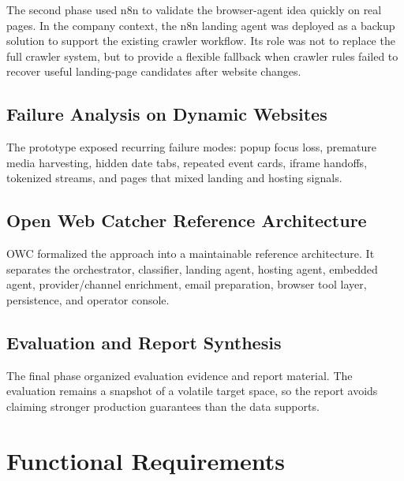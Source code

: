 The second phase used n8n to validate the browser-agent idea quickly on real
pages. In the company context, the n8n landing agent was deployed as a backup
solution to support the existing crawler workflow. Its role was not to replace
the full crawler system, but to provide a flexible fallback when crawler rules
failed to recover useful landing-page candidates after website changes.

\subsection{Failure Analysis on Dynamic Websites}

The prototype exposed recurring failure modes: popup focus loss, premature
media harvesting, hidden date tabs, repeated event cards, iframe handoffs,
tokenized streams, and pages that mixed landing and hosting signals.

\subsection{Open Web Catcher Reference Architecture}

OWC formalized the approach into a maintainable reference architecture. It
separates the orchestrator, classifier, landing agent, hosting agent, embedded
agent, provider/channel enrichment, email preparation, browser tool layer,
persistence, and operator console.

\subsection{Evaluation and Report Synthesis}

The final phase organized evaluation evidence and report material. The
evaluation remains a snapshot of a volatile target space, so the report avoids
claiming stronger production guarantees than the data supports.



\section{Functional Requirements}

